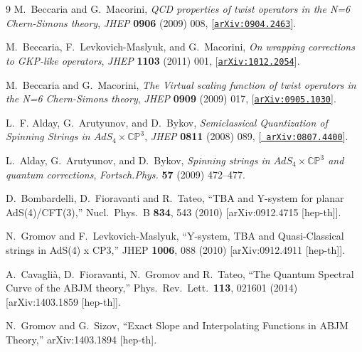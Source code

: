 \documentclass[a4paper,11pt]{article}
\numberwithin{equation}{section}
\begin{document}
\begin{thebibliography} {9}
M.~Beccaria and G.~Macorini, {\it {QCD properties of twist operators in the N=6
  Chern-Simons theory}},  {\em JHEP} {\bf 0906} (2009) 008,
  [\href{http://xxx.lanl.gov/abs/0904.2463}{{\tt arXiv:0904.2463}}].

M.~Beccaria, F.~Levkovich-Maslyuk, and G.~Macorini, {\it {On wrapping
  corrections to GKP-like operators}},  {\em JHEP} {\bf 1103} (2011) 001,
  [\href{http://xxx.lanl.gov/abs/1012.2054}{{\tt arXiv:1012.2054}}].

M.~Beccaria and G.~Macorini, {\it {The Virtual scaling function of twist
  operators in the N=6 Chern-Simons theory}},  {\em JHEP} {\bf 0909} (2009)
  017, [\href{http://xxx.lanl.gov/abs/0905.1030}{{\tt arXiv:0905.1030}}].

L.~F. Alday, G.~Arutyunov, and D.~Bykov, {\it {Semiclassical Quantization of
  Spinning Strings in $AdS_{4}\times \mathbb{CP}^{3}$}},  {\em JHEP} {\bf 0811}
  (2008) 089, [\href{http://xxx.lanl.gov/abs/0807.4400}{{\tt
  arXiv:0807.4400}}].

L.~Alday, G.~Arutyunov, and D.~Bykov, {\it {Spinning strings in $AdS_{4}\times
  \mathbb{CP}^{3}$ and quantum corrections}},  {\em Fortsch.Phys.} {\bf 57}
  (2009) 472--477.

  D.~Bombardelli, D.~Fioravanti and R.~Tateo,
  ``TBA and Y-system for planar AdS(4)/CFT(3),''
  Nucl.\ Phys.\ B {\bf 834}, 543 (2010)
  [arXiv:0912.4715 [hep-th]].

  N.~Gromov and F.~Levkovich-Maslyuk,
  ``Y-system, TBA and Quasi-Classical strings in AdS(4) x CP3,''
  JHEP {\bf 1006}, 088 (2010)
  [arXiv:0912.4911 [hep-th]].

  A.~Cavaglià, D.~Fioravanti, N.~Gromov and R.~Tateo,
  ``The Quantum Spectral Curve of the ABJM theory,''
  Phys.\ Rev.\ Lett.\  {\bf 113}, 021601 (2014)
  [arXiv:1403.1859 [hep-th]].

  N.~Gromov and G.~Sizov,
  ``Exact Slope and Interpolating Functions in ABJM Theory,''
  arXiv:1403.1894 [hep-th].


\end{thebibliography}
\end{document}

